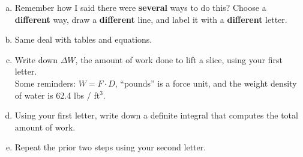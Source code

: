 \begin{enumerate}[(a), leftmargin=15pt]
	\item Remember how I said there were \textbf{several} ways to do this? Choose a \textbf{different} way, draw a \textbf{different} line, and label it with a \textbf{different} letter.
	\item Same deal with tables and equations.

	\begin{minipage}{0.45\textwidth}
	\end{minipage}
	\begin{minipage}{0.45\textwidth}
	\end{minipage}
	\vfill
	\item Write down $\Delta W$, the amount of work done to lift a slice, using your first letter. \\
	{\small Some reminders: $W = F \cdot D$, ``pounds'' is a force unit, and the weight density of water is 62.4 lbs / ft$^3$.}
	\vfill
	\item Using your first letter, write down a definite integral that computes the total amount of work.
	\vfill
	\item Repeat the prior two steps using your second letter.
	\vfill
	

\end{enumerate}


